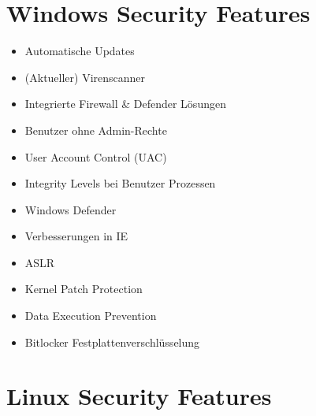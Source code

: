 \section{Windows Security Features}
\begin{itemize}
    \item Automatische Updates
    \item (Aktueller) Virenscanner
    \item Integrierte Firewall \& Defender Lösungen
    \item Benutzer ohne Admin-Rechte
    \item User Account Control (UAC)
    \item Integrity Levels bei Benutzer Prozessen
    \item Windows Defender
    \item Verbesserungen in IE
    \item ASLR
    \item Kernel Patch Protection
    \item Data Execution Prevention
    \item Bitlocker Festplattenverschlüsselung
\end{itemize}

\section{Linux Security Features}
